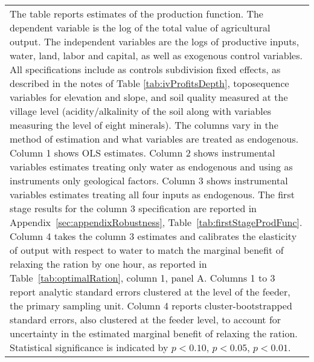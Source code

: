 \begin{table}[!ht]
\begin{tabular}{lrrrr}
	\multicolumn{5}{p{0.55\hsize}}{\footnotesize The table reports estimates of the production function. The dependent variable is the log of the total value of agricultural output. The independent variables are the logs of productive inputs, water, land, labor and capital, as well as exogenous control variables. All specifications include as controls subdivision fixed effects, as described in the notes of Table \ref{tab:ivProfitsDepth}, toposequence variables for elevation and slope, and soil quality measured at the village level (acidity/alkalinity of the soil along with variables measuring the level of eight minerals). The columns vary in the method of estimation and what variables are treated as endogenous. Column 1 shows OLS estimates. Column 2 shows instrumental variables estimates treating only water as endogenous and using as instruments only geological factors. Column 3 shows instrumental variables estimates treating all four inputs as endogenous. The first stage results for the column 3 specification are reported in Appendix~\ref{sec:appendixRobustness}, Table~\ref{tab:firstStageProdFunc}. Column 4 takes the column 3 estimates and calibrates the elasticity of output with respect to water to match the marginal benefit of relaxing the ration by one hour, as reported in Table~\ref{tab:optimalRation}, column 1, panel A. Columns 1 to 3 report analytic standard errors clustered at the level of the feeder, the primary sampling unit. Column 4 reports cluster-bootstrapped standard errors, also clustered at the feeder level, to account for uncertainty in the estimated marginal benefit of relaxing the ration. Statistical significance is indicated by \sym{*} $ p < 0.10$, \sym{**} $ p < 0.05$, \sym{***} $ p < 0.01$.}\\
	\end{tabular}
\end{table}
